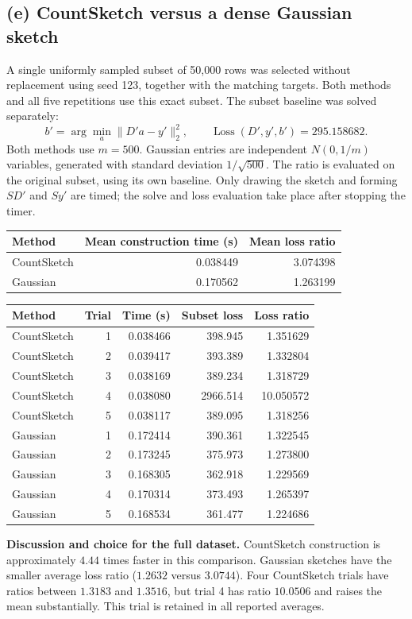 \documentclass[11pt,a4paper]{article}
\newcommand{\loss}{\operatorname{Loss}}
\begin{document}
\subsection*{(e) CountSketch versus a dense Gaussian sketch}
A single uniformly sampled subset of 50,000 rows was selected without
replacement using seed 123, together with the matching targets.
Both methods and all five repetitions use this exact subset.
The subset baseline was solved separately:
\[
 b'=\arg\min_a\|D'a-y'\|_2^2,\qquad
 \loss(D',y',b')=295.158682.
\]
Both methods use $m=500$. Gaussian entries are independent
$N(0,1/m)$ variables, generated with standard deviation $1/\sqrt{500}$.
The ratio is evaluated on the original subset, using its own baseline.
Only drawing the sketch and forming $SD'$ and $Sy'$ are timed; the solve
and loss evaluation take place after stopping the timer.
\begin{center}
\begin{tabular}{lrr}
\toprule
Method & Mean construction time (s) & Mean loss ratio \\
\midrule
CountSketch & 0.038449 & 3.074398 \\
Gaussian & 0.170562 & 1.263199 \\
\bottomrule
\end{tabular}
\end{center}
\begin{center}
\small
\begin{tabular}{lrrrr}
\toprule
Method & Trial & Time (s) & Subset loss & Loss ratio \\
\midrule
CountSketch & 1 & 0.038466 & 398.945 & 1.351629 \\
CountSketch & 2 & 0.039417 & 393.389 & 1.332804 \\
CountSketch & 3 & 0.038169 & 389.234 & 1.318729 \\
CountSketch & 4 & 0.038080 & 2966.514 & 10.050572 \\
CountSketch & 5 & 0.038117 & 389.095 & 1.318256 \\
Gaussian & 1 & 0.172414 & 390.361 & 1.322545 \\
Gaussian & 2 & 0.173245 & 375.973 & 1.273800 \\
Gaussian & 3 & 0.168305 & 362.918 & 1.229569 \\
Gaussian & 4 & 0.170314 & 373.493 & 1.265397 \\
Gaussian & 5 & 0.168534 & 361.477 & 1.224686 \\
\bottomrule
\end{tabular}
\end{center}
\textbf{Discussion and choice for the full dataset.}
CountSketch construction is approximately $4.44$ times faster in this
comparison. Gaussian sketches have the smaller average loss ratio
($1.2632$ versus $3.0744$). Four CountSketch trials have ratios between
$1.3183$ and $1.3516$, but trial 4 has ratio $10.0506$ and raises the mean
substantially. This trial is retained in all reported averages.
\end{document}
